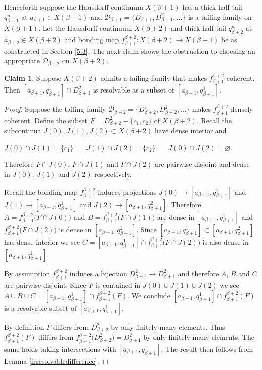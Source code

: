\documentclass[12pt]{article}
\theoremstyle{plain}
\theoremstyle{definition}
\newcounter{claim5counter}
\newtheorem{claim5}[claim5counter]{Claim}
\newcommand{\B}{\ensuremath{\beta}}
\newcommand{\0}{\ensuremath{\varnothing}}
\newcommand{\cD}{\ensuremath{\mathcal D}}
\begin{document}
	
	Henceforth suppose the Hausdorff continuum $X(\B+1)$ has a thick half-tail $q^n_{\B+1}$ at \mbox{$a_{\B+1} \in X(\B+1)$} 
	and $\cD_{\B+1} = \{D_{\B+1}^1, D_{\B+1}^2, \ldots\}$ is a tailing family on $X(\B+1)$.
	Let the Hausdorff continuum $X(\B+2)$ and thick half-tail $q^n_{\B+2}$ at $a_{\B+2} \in X(\B+2)$ 
	and bonding map $f^{\B+2}_{\B+1}: X(\B+2) \to X(\B+1)$ be as constructed in Section \ref{5.3}.
	The next claim shows the obstruction to choosing an appropriate $\cD_{\B+2}$ on $X(\B+2)$.
	
	\begin{claim5}\label{resolvableStep}
		Suppose $X(\B+2)$ admits a tailing family that makes $f^{\B+2}_{\B+1}$ coherent.
		Then $[a_{\B+1}, q_{\B+1}^1] \cap D^2_{\B+1}$ is resolvable as a subset of $[a_{\B+1}, q_{\B+1}^1]$.
	\end{claim5}
	
	\begin{proof}
		
		Suppose the tailing family $\cD_{\B+2} = \{D_{\B+2}^1, D_{\B+2}^2, \ldots\}$ makes $f^{\B+2}_{\B+1}$ densely coherent.
		Define the subset $F = D^2_{\B+2} - \{c_1,c_2\}$ of $X({\B+2})$.
		Recall the subcontinua $J(0), J(1),J(2) \subset X(\B+2)$ have dense interior and
		
		\begin{center}
			$J(0) \cap J(1) = \{c_1\} \ \ \ \ \ \ \ \ J(1) \cap J(2) = \{c_2\} \ \ \ \ \ \ \ \ J(0) \cap J(2) = \0$.
		\end{center}
		
		Therefore $F \cap J(0)$, $F \cap J(1)$ and $F \cap J(2)$ are pairwise disjoint and dense in $J(0)$, $J(1)$ and $J(2)$ respectively.
		
		Recall the bonding map $f^{\B+2}_{\B+1}$ induces projections 
		$J(0) \to [a_{\B+1}, q_{\B+1}^1]$ and  $J(1) \to [a_{\B+1}, q_{\B+1}^1]$ and \mbox{$J(2) \to [a_{\B+1}, q_{\B+1}^2]$}.
		Therefore $A = f^{\B+2}_{\B+1} \big ( F \cap J(0) \big )$ and $B = f^{\B+2}_{\B+1} \big ( F \cap J(1) \big )$ are dense in $[a_{\B+1}, q_{\B+1}^1]$
		and $f^{\B+2}_{\B+1}  \big (F \cap J(2) \big )$ is dense in $[a_{\B+1}, q_{\B+1}^2]$.
		Since $[a_{\B+1}, q_{\B+1}^1] \subset [a_{\B+1}, q_{\B+1}^2]$ has dense interior 
		we see $C = [a_{\B+1}, q_{\B+1}^1] \cap f^{\B+2}_{\B+1}  \big ( F \cap J(2) \big )$ is also dense in $[a_{\B+1}, q_{\B+1}^1]$. 
		
		By assumption $f^{\B+2}_{\B+1}$ induces a bijection $ D^2_{\B+2} \to D^2_{\B +1}$ and therefore $A$, $B$ and $C$ are pairwise disjoint.
		Since $F$ is contained in $J(0) \cup J(1) \cup J(2)$ we see $A \cup B \cup C = [a_{\B+1}, q_{\B+1}^1] \cap f^{\B+2}_{\B+1}(F)$.
		We conclude $[a_{\B+1}, q_{\B+1}^1] \cap f^{\B+2}_{\B+1}(F)$ is a resolvable subset of $[a_{\B+1}, q_{\B+1}^1]$. 
		
		By definition $F$ differs from $D^2_{\B+2}$ by only finitely many elements.
		Thus $f^{\B+2}_{\B+1}(F)$ differs from $f^{\B+2}_{\B+1}\big (D^2_{\B+2} \big ) = D^2_{\B+1}$ by only finitely many elements.
		The same holds taking intersections with $[a_{\B+1}, q_{\B+1}^1]$.
		The result then follows from Lemma \ref{irresolvabledifference}.
	\end{proof}
	
\end{document}
